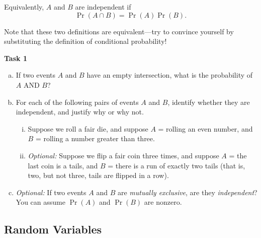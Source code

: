 \documentclass[12pt,letterpaper]{article}
\newenvironment{22enumerate}{\begin{enumerate}[a.]\itemsep0em}{\end{enumerate}}
\newif\ifsol
\newcommand{\solu}[2]{ \begin{mdframed} \ifsol #2 \else \vspace{#1} \fi \end{mdframed} }
\begin{document}
Equivalently, $A$ and $B$ are independent if
\[
\Pr(A \cap B) = \Pr(A)\Pr(B).
\]

Note that these two definitions are equivalent---try to convince yourself by substituting the definition of conditional probability!

\textbf{Task 1}
\begin{22enumerate}
    \item If two events $A$ and $B$ have an empty intersection, what is the probability of $A$ AND $B$?

    \solu{0.5cm}{0}

    \item For each of the following pairs of events $A$ and $B$, identify whether they are independent, and justify why or why not.

    \begin{enumerate}[i.]

    \item Suppose we roll a fair die, and suppose $A$ = rolling an even number, and $B$ = rolling a number greater than three.
    \solu{1cm}{Not independent: $\Pr(A)=\frac{1}{2}$, $\Pr(B)=\frac{1}{2}$. $A \cap B = \{4, 6\}$, so $\Pr(A \cap B)=\frac{1}{3}$, but $\frac{1}{2}\times \frac{1}{2}=\frac{1}{4}$}
    
    \item \textit{Optional:} Suppose we flip a fair coin three times, and suppose $A$ = the last coin is a tails, and $B$ = there is a run of exactly two tails (that is, two, but not three, tails are flipped in a row). 
    \solu{1cm}{Independent: $\Pr(A)=\frac{1}{2}$, and $B=\{TTH, HTT\}$ so $\Pr(B)= \frac{2}{8}=\frac{1}{4}$. $A \cap B = \{HTT\}$ so $\Pr(A \cap B) = \frac{1}{8}$ which is $\frac{1}{2}\times\frac{1}{4}$}
    
    \end{enumerate}
    
    \item \textit{Optional:} If two events $A$ and $B$ are \textit{mutually exclusive}, are they \textit{independent}? You can assume $\Pr(A)$ and $\Pr(B)$ are nonzero.
    \solu{1cm}{No. By definition, $Pr(A \cap B)=0$, so if the probability of each individual event occurring is nonzero, then $\Pr(A \cap B) \neq \Pr(A)\Pr(B)$.}
\end{22enumerate}

\subsection*{Random Variables}
\end{document}
